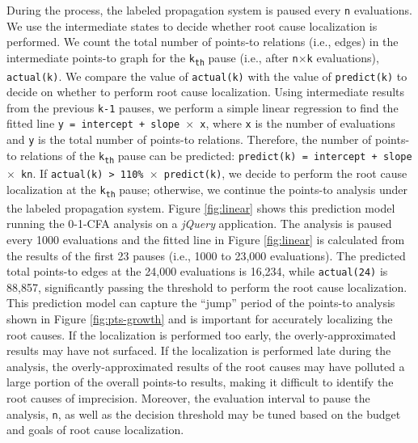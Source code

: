 During the process, the labeled propagation system is paused every {\tt n} evaluations. We use the intermediate states to decide whether root cause localization is performed. We count the total number of points-to relations (i.e., edges) in the intermediate points-to graph for the {\tt k\textsubscript{th}} pause (i.e., after {\tt n$\times$k} evaluations), {\tt actual(k)}. We compare the value of {\tt actual(k)} with the value of {\tt predict(k)} to decide on whether to perform root cause localization. Using intermediate results from the previous {\tt k-1} pauses, we perform a simple linear regression to find the fitted line {\tt y = intercept + slope $\times$ x}, where {\tt x} is the number of evaluations and {\tt y} is the total number of points-to relations. Therefore, the number of points-to relations of the {\tt k\textsubscript{th}} pause can be predicted: {\tt predict(k) = intercept + slope $\times$ kn}. If {\tt actual(k) > 110\% $\times$ predict(k)}, we decide to perform the root cause localization at the {\tt k\textsubscript{th}} pause; otherwise, we continue the points-to analysis under the labeled propagation system. Figure \ref{fig:linear} shows this prediction model running the 0-1-CFA analysis on a {\it jQuery} application. The analysis is paused every 1000 evaluations and the fitted line in Figure \ref{fig:linear} is calculated from the results of the first 23 pauses (i.e., 1000 to 23,000 evaluations). The predicted total points-to edges at the 24,000 evaluations is 16,234, while {\tt actual(24)} is 88,857, significantly passing the threshold to perform the root cause localization. This prediction model can capture the ``jump'' period of the points-to analysis shown in Figure \ref{fig:pts-growth} and is important for accurately localizing the root causes. If the localization is performed too early, the overly-approximated results may have not surfaced. If the localization is performed late during the analysis, the overly-approximated results of the root causes may have polluted a large portion of the overall points-to results, making it difficult to identify the root causes of imprecision. Moreover, the evaluation interval to pause the analysis, {\tt n}, as well as the decision threshold may be tuned based on the budget and goals of root cause localization.


